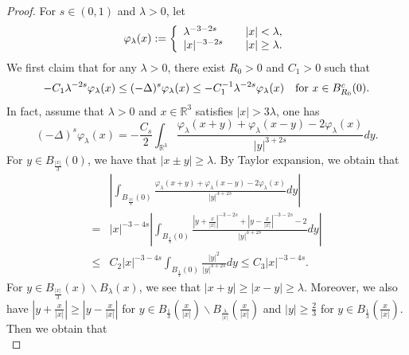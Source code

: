 \documentclass[reqno, 11pt]{amsart} %
\numberwithin{equation}{section}
\begin{document}
	\begin{proof}
		For $s\in (0, 1)$ and $\lambda>0$, let
		\begin{equation*}
			\varphi_{\lambda}(x):=
			\left\{
			\begin{array}{ll}
				\lambda^{-3-2s} &\quad \hbox{$|x|<\lambda$},\\
				|x|^{-3-2s}&\quad \hbox{$|x|\geq\lambda$}.
			\end{array}
			\right.
		\end{equation*}
		We first claim that for any $\lambda>0$, there exist $R_{0}>0$ and $C_{1}>0$ such that
		\begin{equation}\label{equ5-12}
			-C_{1}\lambda^{-2s}\varphi_{\lambda}(x)\leq(-\Delta)^{s}\varphi_{\lambda}(x)\leq-C_{1}^{-1}\lambda^{-2s}\varphi_{\lambda}(x)\quad \hbox{for $x\in B^{c}_{R_{0}}(0)$}.
		\end{equation}
		In fact, assume that $\lambda>0$ and $x\in \mathbb{R}^{3}$ satisfies $|x|>3\lambda$, one has
		\begin{equation}\label{equ5-13}
			(-\Delta)^{s}\varphi_{\lambda}(x)=-\frac{C_{s}}{2}\int_{\mathbb{R}^{3}}\frac{\varphi_{\lambda}(x+y)+\varphi_{\lambda}(x-y)-2\varphi_{\lambda}(x)}{|y|^{3+2s}}dy.
		\end{equation}		
		For $y\in B_{\frac{|x|}{3}}(0)$, we have that $|x\pm y|\geq\lambda$. By Taylor expansion, we obtain that
		\begin{equation}\label{equ5-14}
			\begin{split}
				&	\left| \int_{B_{\frac{|x|}{3}}(0)}\frac{\varphi_{\lambda}(x+y)+\varphi_{\lambda}(x-y)-2\varphi_{\lambda}(x)}{|y|^{3+2s}}dy\right| \\
				=&|x|^{-3-4s}\left| \int_{B_{\frac{1}{3}}(0)}\frac{\left| y+\frac{x}{|x|}\right|^{-3-2s}+\left| y-\frac{x}{|x|}\right|^{-3-2s}-2}{|y|^{3+2s}}dy\right| \\
				\leq&C_{2}|x|^{-3-4s}\int_{B_{\frac{1}{3}}(0)}\frac{|y|^{2}}{|y|^{3+2s}}dy\leq C_{3}|x|^{-3-4s}.
			\end{split}
		\end{equation}
		For $y\in B_{\frac{|x|}{3}}(x)\backslash B_{\lambda}(x)$, we see that $|x+y|\geq|x-y|\geq\lambda$. Moreover, we also have $\left| y+\frac{x}{|x|}\right|\geq\left| y-\frac{x}{|x|}\right|$ for $y\in B_{\frac{1}{3}}\left( \frac{x}{|x|}\right)\backslash B_{\frac{\lambda}{|x|}}\left( \frac{x}{|x|}\right)$ and $|y|\geq\frac{2}{3}$ for $y\in B_{\frac{1}{3}}\left( \frac{x}{|x|}\right)$. Then we obtain that
		\begin{equation}\label{equ5-15}

\end{equation}
\end{proof}
\end{document}
